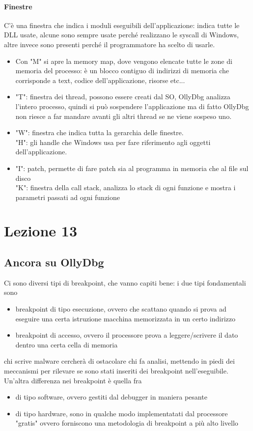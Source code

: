 \documentclass[12pt, oneside]{extbook}
\begin{document}
\subsubsection{Finestre}
C'è una finestra che indica i moduli eseguibili dell'applicazione: indica tutte le DLL usate, alcune sono sempre usate perché realizzano le syscall di Windows, altre invece sono presenti perché il programmatore ha scelto di usarle.\\ 
\begin{itemize}
\item Con "M" si apre la memory map, dove vengono elencate tutte le zone di memoria del processo: è un blocco contiguo di indirizzi di memoria che corrisponde a text, codice dell'applicazione, risorse etc...
\item "T": finestra dei thread, possono essere creati dal SO, OllyDbg analizza l'intero processo, quindi si può sospendere l'applicazione ma di fatto OllyDbg non riesce a far mandare avanti gli altri thread se ne viene sospeso uno.
\item "W": finestra che indica tutta la gerarchia delle finestre.\\ "H": gli handle che Windows usa per fare riferimento agli oggetti dell'applicazione.
\item "I": patch, permette di fare patch sia al programma in memoria che al file sul disco\\ "K": finestra della call stack, analizza lo stack di ogni funzione e mostra i parametri passati ad ogni funzione
\end{itemize}
\chapter{Lezione 13}
\section{Ancora su OllyDbg}
Ci sono diversi tipi di breakpoint, che vanno capiti bene: i due tipi fondamentali sono
\begin{itemize}
\item breakpoint di tipo esecuzione, ovvero che scattano quando si prova ad eseguire una certa istruzione macchina memorizzata in un certo indirizzo
\item breakpoint di accesso, ovvero il processore prova a leggere/scrivere il dato dentro una certa cella di memoria
\end{itemize}
chi scrive malware cercherà di ostacolare chi fa analisi, mettendo in piedi dei meccanismi per rilevare se sono stati inseriti dei breakpoint nell'eseguibile. Un'altra differenza nei breakpoint è quella fra
\begin{itemize}
\item di tipo software, ovvero gestiti dal debugger in maniera pesante
\item di tipo hardware, sono in qualche modo implementatati dal processore "gratis" ovvero forniscono una metodologia di breakpoint a più alto livello
\end{itemize}
\end{document}
